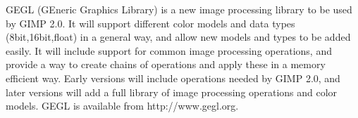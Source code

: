 GEGL (GEneric Graphics Library) is a new image processing library to be used by
GIMP 2.0. It will support different color models and data types
(8bit,16bit,float) in a general way, and allow new models and types to be added
easily.  It will include support for common image processing operations, and
provide a way to create chains of operations and apply these in a memory
efficient way.  Early versions will include operations needed by GIMP 2.0, and
later versions will add a full library of image processing operations and color
models. GEGL is available from http://www.gegl.org.
